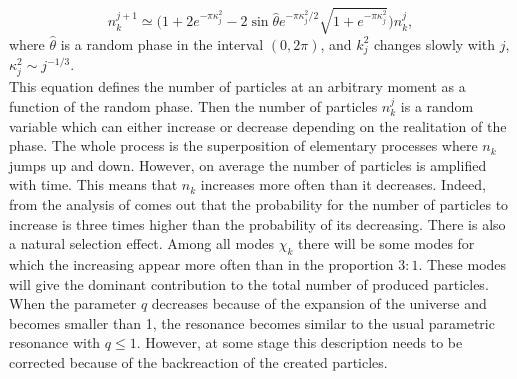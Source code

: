 \documentclass[11pt,a4paper,twoside]{book}
\begin{document}
\begin{equation}
\label{Chap4:numberkRandom}
	n_{k}^{j+1} \simeq \Bigg(1 + 2 e^{-\pi\kappa_{j}^{2}} -2\sin\hat{\theta}e^{-\pi\kappa_{j}^{2}/2}\sqrt{1+e^{-\pi\kappa_{j}^{2}}}\Bigg)n_{k}^{j},
\end{equation}
where $\hat{\theta}$ is a random phase in the interval $ (0,2\pi) $, and $ k_{j}^{2} $ changes slowly with $ j $, $\kappa_{j}^{2} \sim j^{-1/3}$.\\
This equation defines the number of particles at an arbitrary moment as a function of the random phase. Then the number of particles $ n_{k}^{j} $ is a random variable which can either increase or decrease depending on the realitation of the phase. The whole process is the superposition of elementary processes where $ n_{k} $ jumps up and down. However, on average the number of particles is amplified with time. This means that $ n_{k} $ increases more often than it decreases. Indeed, from the analysis of \cite{Chap4:LindePreheatingModel} comes out that the probability for the number of particles to increase is three times higher than the probability of its decreasing. There is also a natural selection effect. Among all modes $ \chi_{k} $ there will be some modes for which the increasing appear more often than in the proportion $ 3:1 $. These modes will give the dominant contribution to the total number of produced particles.\\
When the parameter $ q $ decreases because of the expansion of the universe and becomes smaller than 1, the resonance becomes similar to the usual parametric resonance with $ q\le 1 $. However, at some stage this description needs to be corrected because of the backreaction of the created particles.
\end{document}
